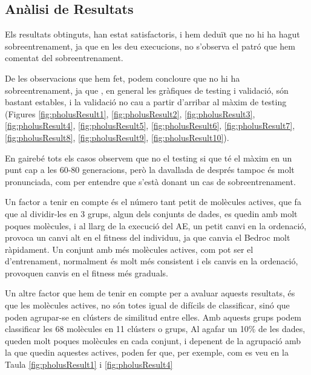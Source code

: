 \subsection{Anàlisi de Resultats} %
\label{sub:Analisi de Resultats}

Els resultats obtinguts, han estat satisfactoris, i hem deduït que no hi ha
hagut sobreentrenament, ja que en les deu execucions, no s'observa el patró que
hem comentat del sobreentrenament.

De les observacions que hem fet, podem concloure que no hi ha sobreentrenament,
ja que , en general les gràfiques de testing i validació, són bastant estables,
i la validació no cau a partir d'arribar al màxim de testing (Figures \ref{fig:pholusResult1},
\ref{fig:pholusResult2}, \ref{fig:pholusResult3}, \ref{fig:pholusResult4}, \ref{fig:pholusResult5},
\ref{fig:pholusResult6}, \ref{fig:pholusResult7}, \ref{fig:pholusResult8}, \ref{fig:pholusResult9},
\ref{fig:pholusResult10}).

En gairebé tots els casos observem que no el testing si que té el màxim en un
punt cap a les 60-80 generacions, però la davallada de després tampoc és molt
pronunciada, com per entendre que s'està donant un cas de sobreentrenament.

Un factor a tenir en compte és el número tant petit de molècules actives, que fa
que al dividir-les en 3 grups, algun dels conjunts de dades, es quedin amb molt
poques molècules, i al llarg de la execució del AE, un petit canvi en la
ordenació, provoca un canvi alt en el fitness del individuu, ja que canvia el
Bedroc molt ràpidament.  Un conjunt amb més molècules actives, com pot ser el
d'entrenament, normalment és molt més consistent i els canvis en la ordenació,
provoquen canvis en el fitness més graduals.

Un altre factor que hem de tenir en compte per a avaluar aquests resultats, és
que les molècules actives, no són totes igual de difícils de classificar, sinó
que poden agrupar-se en clústers de similitud entre elles.  Amb aquests grups
podem classificar les 68 molècules en 11 clústers o grups,  Al agafar un 10\% de
les dades, queden molt poques molècules en cada conjunt, i depenent de la
agrupació amb la que quedin aquestes actives, poden fer que, per exemple, com es
veu en la Taula \ref{fig:pholusResult1} i \ref{fig:pholusResult4}

